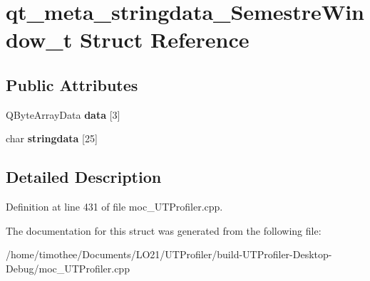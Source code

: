 \hypertarget{structqt__meta__stringdata___semestre_window__t}{\section{qt\-\_\-meta\-\_\-stringdata\-\_\-\-Semestre\-Window\-\_\-t Struct Reference}
\label{structqt__meta__stringdata___semestre_window__t}
}
\subsection*{Public Attributes}
\begin{DoxyCompactItemize}
\item 
\hypertarget{structqt__meta__stringdata___semestre_window__t_a705061d9dcb53d8e0d13e22f7b088c5e}{Q\-Byte\-Array\-Data {\bfseries data} \mbox{[}3\mbox{]}}\label{structqt__meta__stringdata___semestre_window__t_a705061d9dcb53d8e0d13e22f7b088c5e}

\item 
\hypertarget{structqt__meta__stringdata___semestre_window__t_ab7624d0549fca6d65ba502cb2790e27c}{char {\bfseries stringdata} \mbox{[}25\mbox{]}}\label{structqt__meta__stringdata___semestre_window__t_ab7624d0549fca6d65ba502cb2790e27c}

\end{DoxyCompactItemize}


\subsection{Detailed Description}


Definition at line 431 of file moc\-\_\-\-U\-T\-Profiler.\-cpp.



The documentation for this struct was generated from the following file\-:\begin{DoxyCompactItemize}
\item 
/home/timothee/\-Documents/\-L\-O21/\-U\-T\-Profiler/build-\/\-U\-T\-Profiler-\/\-Desktop-\/\-Debug/moc\-\_\-\-U\-T\-Profiler.\-cpp\end{DoxyCompactItemize}

